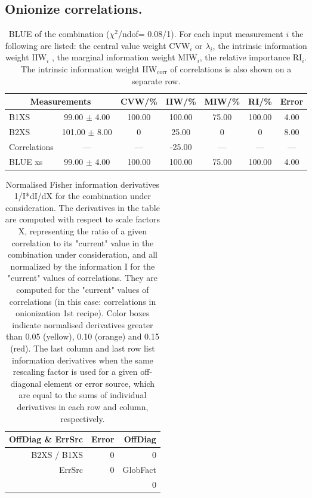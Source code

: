 \subsection{Onionize correlations.}
\begin{table}[H]
\scriptsize
\begin{center}
\renewcommand{\arraystretch}{1.1}
\begin{tabular}{|lc|c|c|c|c|c|}
\hline
\multicolumn{2}{|c|}{Measurements} & CVW/\%  & IIW/\%  & MIW/\%  & RI/\%  & {\tiny Error}\\
\hline
B1XS &      99.00 $\pm$       4.00 &     100.00 &     100.00 &      75.00 &     100.00 &       4.00\\
B2XS &     101.00 $\pm$       8.00 &  0 &      25.00 &  0 &  0 &       8.00\\
Correlations & --- & --- &     -25.00 & --- & --- & ---\\
\hline
BLUE {\tiny xs} &      99.00 $\pm$       4.00 &     100.00 &     100.00 &      75.00 &     100.00 &       4.00\\
\hline
\end{tabular}
\caption{BLUE of the combination ($\chi^2$/ndof=      0.08/1).
 For each input measurement $i$ the following are listed: the central value weight CVW$_i$ or $\lambda_i$, the intrinsic information weight IIW$_i$ , the marginal information weight MIW$_i$, the relative importance RI$_i$. The intrinsic information weight IIW$_{\mathrm{corr}}$ of correlations is also shown on a separate row.}
\renewcommand{\arraystretch}{1}
\end{center}
\end{table}
\begin{table}[H]
\scriptsize
\begin{center}
\renewcommand{\arraystretch}{1.1}
\begin{tabular}{|r|r|r|}
\hline
 OffDiag \& ErrSrc & {\tiny Error} & OffDiag\\
\hline
B2XS / B1XS &  0 &  0 \\
\hline
\multirow{2}{*}{ErrSrc} & \multirow{2}{*}{ 0} & GlobFact\\
 & &  0 \\
\hline
\end{tabular}
\renewcommand{\arraystretch}{1}
\caption{Normalised Fisher information derivatives 1/I*dI/dX for the combination under consideration. The derivatives in the table are computed with respect to scale factors X, representing the ratio of a given correlation to its "current" value in the combination under consideration, and all normalized by the information I for the "current" values of correlations. They are computed for the "current" values of correlations (in this case: correlations in onionization 1st recipe). Color boxes indicate normalised derivatives greater than 0.05 (yellow), 0.10 (orange) and 0.15 (red). The last column and last row list information derivatives when the same rescaling factor is used for a given off-diagonal element or error source, which are equal to the sums of individual derivatives in each row and column, respectively.}
\end{center}
\end{table}

